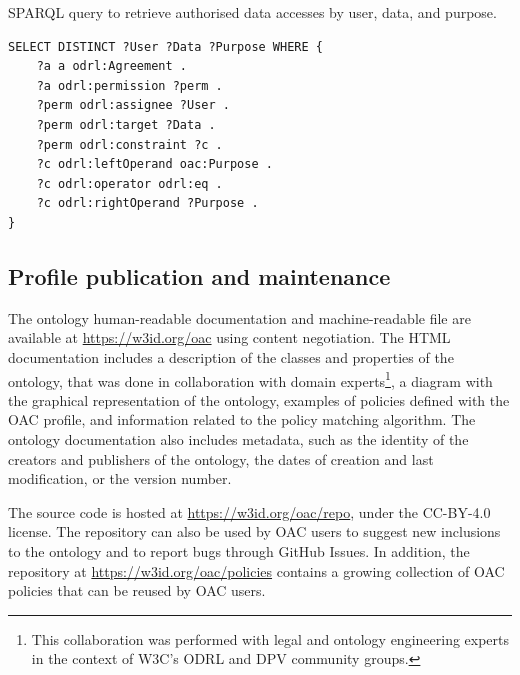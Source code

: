\begin{listing}[ht]
\caption{SPARQL query to retrieve authorised data accesses by user, data, and purpose.}
\label{list:sparql_agreement}
\begin{verbatim}
SELECT DISTINCT ?User ?Data ?Purpose WHERE {
    ?a a odrl:Agreement .
    ?a odrl:permission ?perm .
    ?perm odrl:assignee ?User .
    ?perm odrl:target ?Data .
    ?perm odrl:constraint ?c .
    ?c odrl:leftOperand oac:Purpose .
    ?c odrl:operator odrl:eq .
    ?c odrl:rightOperand ?Purpose .
}
\end{verbatim}
\end{listing}

\subsection{Profile publication and maintenance}
\label{sec:oac_publication}

The ontology human-readable documentation and machine-readable file are available at \url{https://w3id.org/oac} using content negotiation.
The HTML documentation includes a description of the classes and properties of the ontology, that was done in collaboration with domain experts\footnote{This collaboration was performed with legal and ontology engineering experts in the context of W3C's ODRL and DPV community groups.}, a diagram with the graphical representation of the ontology, examples of policies defined with the OAC profile, and information related to the policy matching algorithm.
The ontology documentation also includes metadata, such as the identity of the creators and publishers of the ontology, the dates of creation and last modification, or the version number.

The source code is hosted at \url{https://w3id.org/oac/repo}, under the CC-BY-4.0 license.
The repository can also be used by OAC users to suggest new inclusions to the ontology and to report bugs through GitHub Issues.
In addition, the repository at \url{https://w3id.org/oac/policies} contains a growing collection of OAC policies that can be reused by OAC users.